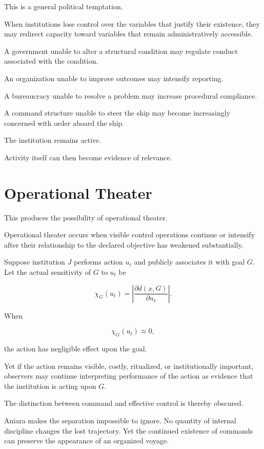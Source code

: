 \documentclass[11pt,oneside]{book}
\theoremstyle{definition}
\theoremstyle{remark}
\begin{document}
This is a general political temptation.

When institutions lose control over the variables that justify their existence, they may redirect capacity toward variables that remain administratively accessible.

A government unable to alter a structural condition may regulate conduct associated with the condition.

An organization unable to improve outcomes may intensify reporting.

A bureaucracy unable to resolve a problem may increase procedural compliance.

A command structure unable to steer the ship may become increasingly concerned with order aboard the ship.

The institution remains active.

Activity itself can then become evidence of relevance.

\section{Operational Theater}

This produces the possibility of operational theater.

Operational theater occurs when visible control operations continue or intensify after their relationship to the declared objective has weakened substantially.

Suppose institution \(J\) performs action \(u_t\) and publicly associates it with goal \(G\). Let the actual sensitivity of \(G\) to \(u_t\) be

\[
\chi_G(u_t)
=
\left|
\frac{\partial d(x,G)}
{\partial u_t}
\right|.
\]

When

\[
\chi_G(u_t)\approx0,
\]

the action has negligible effect upon the goal.

Yet if the action remains visible, costly, ritualized, or institutionally important, observers may continue interpreting performance of the action as evidence that the institution is acting upon \(G\).

The distinction between command and effective control is thereby obscured.

Aniara makes the separation impossible to ignore. No quantity of internal discipline changes the lost trajectory. Yet the continued existence of commands can preserve the appearance of an organized voyage.
\end{document}
